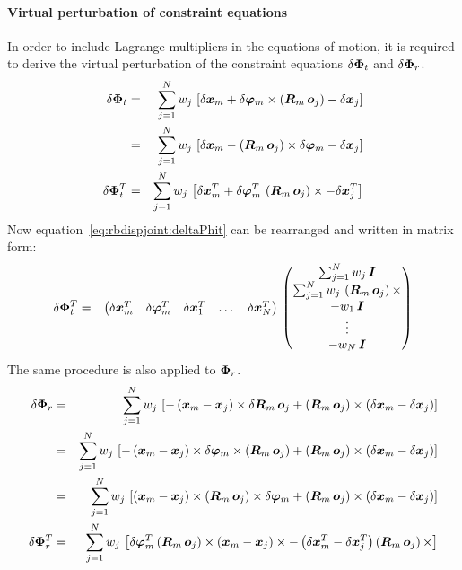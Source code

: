\paragraph{Virtual perturbation of constraint equations}
In order to include Lagrange multipliers in the equations of motion, it is required to derive the virtual perturbation of the constraint equations $\delta\bm{\Phi}_t$ and $\delta\bm{\Phi}_r$.
\begin{eqnarray}
\delta\bm{\Phi}_t & = & \sum_{j=1}^{N} w_j \, \left[\delta\bm{x}_m + \delta\bm{\varphi}_m \times \left(\bm{R}_m \, \bm{o}_j\right) - \delta\bm{x}_j \right] \\
                 & = & \sum_{j=1}^{N} w_j \, \left[\delta\bm{x}_m - \left(\bm{R}_m \, \bm{o}_j\right) \times \delta\bm{\varphi}_m - \delta\bm{x}_j \right] \\
\delta\bm{\Phi}_t^T & = & \sum_{j=1}^{N} w_j \, \left[\delta\bm{x}_m^T + \delta\bm{\varphi}_m^T \, \left(\bm{R}_m \, \bm{o}_j\right)\times - \delta\bm{x}_j^T \right] \label{eq:rbdispjoint:deltaPhit} \\
\end{eqnarray}
Now equation~\ref{eq:rbdispjoint:deltaPhit} can be rearranged and written in matrix form:
\begin{eqnarray}
\delta\bm{\Phi}_t^T & = & \begin{pmatrix}
                   \delta\bm{x}_m^T &
                   \delta\bm{\varphi}_m^T &
                   \delta\bm{x}_1^T &
                   \hdots{} &
                   \delta\bm{x}_N^T
                   \end{pmatrix} \,
\begin{pmatrix}
        \sum_{j=1}^N w_j \, \bm{I} \\
        \sum_{j=1}^N w_j \, \left(\bm{R}_m \, \bm{o}_j\right)\times \\
        -w_1 \, \bm{I} \\
        \vdots{} \\
        -w_N \, \bm{I}
\end{pmatrix}
\end{eqnarray}
The same procedure is also applied to $\bm{\Phi}_r$.
\begin{eqnarray}
\delta\bm{\Phi}_r & = & \sum_{j=1}^{N} w_j\,\left[-\left(\bm{x}_m - \bm{x}_j\right) \times \delta\bm{R}_m \, \bm{o}_j + \left(\bm{R}_m\,\bm{o}_j\right)\times\left(\delta\bm{x}_m - \delta\bm{x}_j\right)\right] \\
& = & \sum_{j=1}^{N} w_j \, \left[-\left(\bm{x}_m - \bm{x}_j\right)\times\delta\bm{\varphi}_m\times\left(\bm{R}_m \, \bm{o}_j\right) + \left(\bm{R}_m\,\bm{o}_j\right) \times \left(\delta\bm{x}_m - \delta\bm{x}_j\right)\right] \\
& = & \sum_{j=1}^{N} w_j \, \left[\left(\bm{x}_m - \bm{x}_j\right)\times\left(\bm{R}_m \, \bm{o}_j\right)\times\delta\bm{\varphi}_m + \left(\bm{R}_m\,\bm{o}_j\right) \times \left(\delta\bm{x}_m - \delta\bm{x}_j\right)\right] \\
\delta\bm{\Phi}_r^T & = & \sum_{j=1}^{N} w_j \, \left[\delta\bm{\varphi}_m^T \left(\bm{R}_m \, \bm{o}_j\right)\times\left(\bm{x}_m - \bm{x}_j\right)\times - \left(\delta\bm{x}_m^T - \delta\bm{x}_j^T\right) \left(\bm{R}_m\,\bm{o}_j\right) \times \right] \label{eq:rbdispjoint:deltaPhir}
\end{eqnarray}

